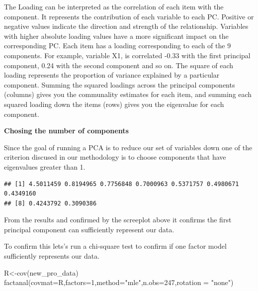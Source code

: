 \documentclass[
]{article}
\newenvironment{Shaded}{\begin{snugshade}}{\end{snugshade}}
\newcommand{\AttributeTok}[1]{\textcolor[rgb]{0.77,0.63,0.00}{#1}}
\newcommand{\DecValTok}[1]{\textcolor[rgb]{0.00,0.00,0.81}{#1}}
\newcommand{\FunctionTok}[1]{\textcolor[rgb]{0.00,0.00,0.00}{#1}}
\newcommand{\NormalTok}[1]{#1}
\newcommand{\OtherTok}[1]{\textcolor[rgb]{0.56,0.35,0.01}{#1}}
\newcommand{\SpecialCharTok}[1]{\textcolor[rgb]{0.00,0.00,0.00}{#1}}
\newcommand{\StringTok}[1]{\textcolor[rgb]{0.31,0.60,0.02}{#1}}
\begin{document}
The Loading can be interpreted as the correlation of each item with the
component. It represents the contribution of each variable to each PC.
Positive or negative values indicate the direction and strength of the
relationship. Variables with higher absolute loading values have a more
significant impact on the corresponding PC. Each item has a loading
corresponding to each of the 9 components. For example, variable X1, is
correlated -0.33 with the first principal component, 0.24 with the
second component and so on. The square of each loading represents the
proportion of variance explained by a particular component. Summing the
squared loadings across the principal components (columns) gives you the
communality estimates for each item, and summing each squared loading
down the items (rows) gives you the eigenvalue for each component.

\textbf{Chosing the number of components}

Since the goal of running a PCA is to reduce our set of variables down
one of the criterion discused in our methodology is to choose components
that have eigenvalues greater than 1.

\begin{Shaded}
\end{Shaded}

\begin{verbatim}
## [1] 4.5011459 0.8194965 0.7756848 0.7000963 0.5371757 0.4980671 0.4349160
## [8] 0.4243792 0.3090386
\end{verbatim}

From the results and confirmed by the screeplot above it confirms the
first principal component can sufficiently represent our data.

To confirm this lets's run a chi-square test to confirm if one factor
model sufficiently represents our data.

\begin{Shaded}
\begin{Highlighting}[]
\NormalTok{R}\OtherTok{\textless{}{-}}\FunctionTok{cov}\NormalTok{(new\_pro\_data)}
\FunctionTok{factanal}\NormalTok{(}\AttributeTok{covmat=}\NormalTok{R,}\AttributeTok{factors=}\DecValTok{1}\NormalTok{,}\AttributeTok{method=}\StringTok{"mle"}\NormalTok{,}\AttributeTok{n.obs=}\DecValTok{247}\NormalTok{,}\AttributeTok{rotation =} \StringTok{"none"}\NormalTok{)}
\end{Highlighting}
\end{Shaded}
\end{document}
